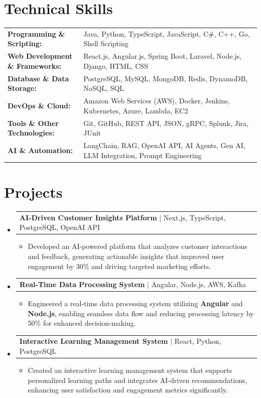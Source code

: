 \documentclass[letterpaper,10pt]{article}
\makeatletter
\newcommand{\resumeItem}[1]{
  \item{\fontsize{8pt}{9pt}\selectfont
    #1 \vspace{-3pt}
  }
}
\newcommand{\resumeProjectHeading}[2]{
    \item
    \begin{tabular*}{1.001\textwidth}{l@{\extracolsep{\fill}}r}
      \fontsize{8.5pt}{10pt}#1 & \textbf{\fontsize{8.5pt}{10pt} #2}\\
    \end{tabular*}\vspace{-7pt}
}
\newcommand{\resumeSubHeadingListStart}{\begin{itemize}[leftmargin=0pt, label={}]}
\newcommand{\resumeSubHeadingListEnd}{\end{itemize}}
\newcommand{\resumeItemListStart}{\begin{itemize}[leftmargin=*]}
\newcommand{\resumeItemListEnd}{\end{itemize}\vspace{-5pt}}
\makeatother
\begin{document}
\section{Technical Skills}
        \vspace{-14pt}
        \begin{table}[h]
            \fontsize{8pt}{9pt}\selectfont
            \begin{tabular}{p{0.3\linewidth} p{0.7\linewidth}}
                \textbf{Programming \& Scripting:} & Java, Python, TypeScript, JavaScript, C\#, C++, Go, Shell Scripting \\
                \textbf{Web Development \& Frameworks:} & React.js, Angular.js, Spring Boot, Laravel, Node.js, Django, HTML, CSS \\
                \textbf{Database \& Data Storage:} & PostgreSQL, MySQL, MongoDB, Redis, DynamoDB, NoSQL, SQL \\
                \textbf{DevOps \& Cloud:} & Amazon Web Services (AWS), Docker, Jenkins, Kubernetes, Azure, Lambda, EC2 \\
                \textbf{Tools \& Other Technologies:} & Git, GitHub, REST API, JSON, gRPC, Splunk, Jira, JUnit \\
                \textbf{AI \& Automation:} & LangChain, RAG, OpenAI API, AI Agents, Gen AI, LLM Integration, Prompt Engineering \\
            \end{tabular}
        \end{table}
 \vspace{-18pt}

\section{Projects}
    \vspace{-5pt}
    \resumeSubHeadingListStart
          \resumeProjectHeading
            {\textbf{AI-Driven Customer Insights Platform} $|$ Next.js, TypeScript, PostgreSQL, OpenAI API}{}
            \resumeItemListStart
                \resumeItem{Developed an AI-powered platform that analyzes customer interactions and feedback, generating actionable insights that improved user engagement by 30\% and driving targeted marketing efforts.}
            \resumeItemListEnd
        \vspace{-12pt}
    
        \resumeProjectHeading
            {\textbf{Real-Time Data Processing System} $|$ Angular, Node.js, AWS, Kafka}{}
        \resumeItemListStart
                \resumeItem{Engineered a real-time data processing system utilizing \textbf{Angular} and \textbf{Node.js}, enabling seamless data flow and reducing processing latency by 50\% for enhanced decision-making.}
        \resumeItemListEnd
      \vspace{-12pt}
      \resumeProjectHeading
        {\textbf{Interactive Learning Management System} $|$ React, Python, PostgreSQL}{}
    \resumeItemListStart
            \resumeItem{Created an interactive learning management system that supports personalized learning paths and integrates AI-driven recommendations, enhancing user satisfaction and engagement metrics significantly.}
    \resumeItemListEnd
    \resumeSubHeadingListEnd
\end{document}

